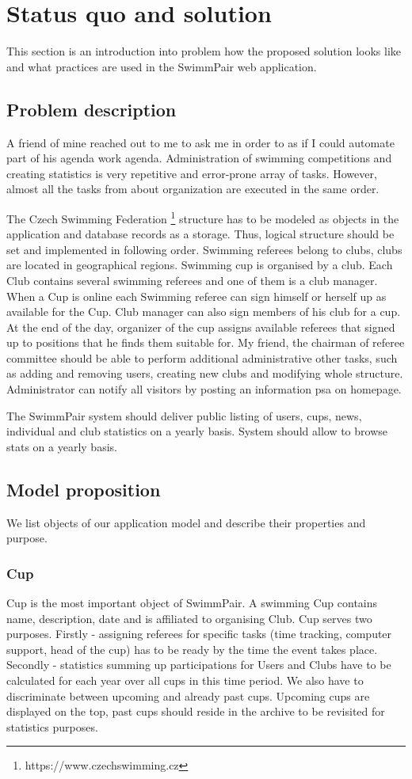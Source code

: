 \chapter{Status quo and solution}
This section is an introduction into problem how the proposed solution looks like and what practices are used in the SwimmPair web application. 
\section{Problem description}
\par
A friend of mine reached out to me to ask me in order to as if I could automate part of his agenda work agenda. Administration of swimming competitions and creating statistics is very repetitive and error-prone array of tasks. However, almost all the tasks from about organization are executed in the same order.
\par
The Czech Swimming Federation \footnote{https://www.czechswimming.cz} structure has to be modeled as objects in the application and database records as a storage. Thus, logical structure should be set and implemented in following order. Swimming referees belong to clubs, clubs are located in geographical regions. Swimming cup is organised by a club. Each Club contains several swimming referees and one of them is a club manager. When a Cup is online each Swimming referee can sign himself or herself up as available for the Cup. Club manager can also sign members of his club for a cup. At the end of the day, organizer of the cup assigns available referees that signed up to positions that he finds them suitable for. My friend, the chairman of referee committee should be able to perform additional administrative other tasks, such as adding and removing users, creating new clubs and modifying whole structure. Administrator can notify all visitors by posting an information psa on homepage.
\par
The SwimmPair system should deliver public listing of users, cups, news, individual and club statistics on a yearly basis. System should allow to browse stats on a yearly basis. 


\section{Model proposition}
We list objects of our application model and describe their properties and purpose.
\subsection*{Cup}
Cup is the most important object of SwimmPair. A swimming Cup contains name, description, date and is affiliated to organising Club. Cup serves two purposes. Firstly - assigning referees for specific tasks (time tracking, computer support, head of the cup) has to be ready by the time the event takes place. Secondly - statistics summing up participations for Users and Clubs have to be calculated for each year over all cups in this time period. We also have to discriminate between upcoming and already past cups. Upcoming cups are displayed on the top, past cups should reside in the archive to be revisited for statistics purposes.
